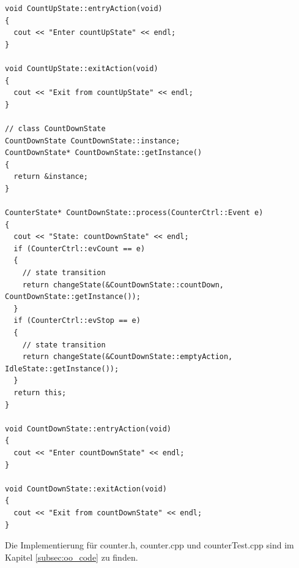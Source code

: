 \begin{itemize}
\begin{lstlisting}[style=Cpp]
void CountUpState::entryAction(void)
{
  cout << "Enter countUpState" << endl;
}

void CountUpState::exitAction(void)
{
  cout << "Exit from countUpState" << endl;
}

// class CountDownState
CountDownState CountDownState::instance;
CountDownState* CountDownState::getInstance()
{
  return &instance;
}

CounterState* CountDownState::process(CounterCtrl::Event e)
{
  cout << "State: countDownState" << endl;
  if (CounterCtrl::evCount == e)
  {
    // state transition
    return changeState(&CountDownState::countDown, CountDownState::getInstance());
  }
  if (CounterCtrl::evStop == e)
  {
    // state transition
    return changeState(&CountDownState::emptyAction, IdleState::getInstance());
  }
  return this;
}

void CountDownState::entryAction(void)
{
  cout << "Enter countDownState" << endl;
}

void CountDownState::exitAction(void)
{
  cout << "Exit from countDownState" << endl;
}
\end{lstlisting}
\end{itemize}
Die Implementierung für counter.h, counter.cpp und counterTest.cpp sind im Kapitel \ref{subsec:oo_code} zu finden.\\

